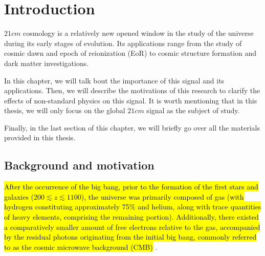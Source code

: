 \documentclass[12pt, TexShade, letterpaper]{report}
\begin{document}
	\listoffigures\thispagestyle{plain}
	\listoftables
	\glsaddall
	\setlength\LTleft{0pt}
	\setlength\LTright{0pt}
	\setlength\glsdescwidth{0.8\hsize}
	\printglossary[title={List of Acronyms}]

 	\clearpage
	
	\glsresetall
\chapter{Introduction}
\label{chap:intro}
$21cm$ cosmology is a relatively new opened window in the study of the universe during its early stages of evolution. Its applications range from the study of cosmic dawn and epoch of reionization (EoR) to cosmic structure formation and dark matter investigations\cite{SKA_dark_ages}.\par
In this chapter, we will talk bout the importance of this signal and its applications. Then, we will describe the motivations of this research to clarify the effects of non-standard physics on this signal. It is worth mentioning that in this thesis, we will only focus on the global $21cm$ signal as the subject of study.\par
Finally, in the last section of this chapter, we will briefly go over all the materials provided in this thesis.\par
\section{Background and motivation}
\hl{After the occurrence of the big bang, prior to the formation of the first stars and galaxies ($200 \lesssim z \lesssim 1100$), the universe was primarily composed of gas (with hydrogen constituting approximately 75\% and helium, along with trace quantities of heavy elements, comprising the remaining portion). Additionally, there existed a comparatively smaller amount of free electrons relative to the gas, accompanied by the residual photons originating from the initial big bang, commonly referred to as the cosmic microwave background (CMB) }\cite{map_universe, 21century}.
\end{document}
